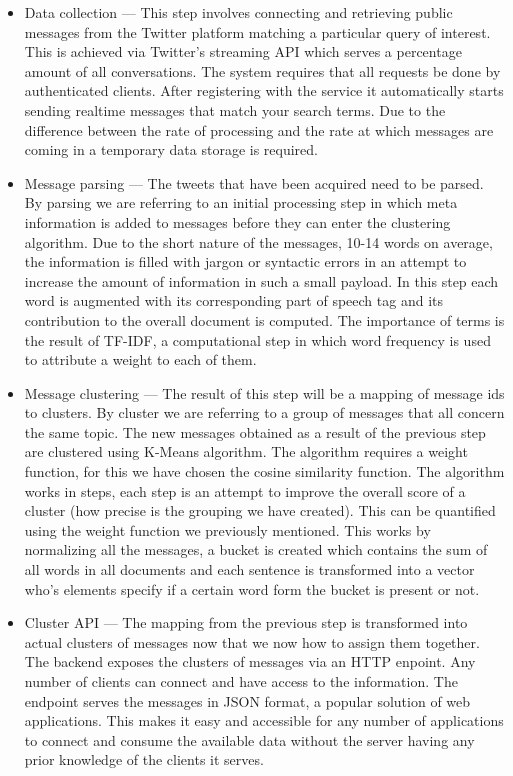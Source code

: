 \begin{itemize}
	\item Data collection --- This step involves connecting and retrieving public messages from the Twitter platform matching a particular query of interest. This is achieved via Twitter's streaming API which serves a percentage amount of all conversations. The system requires that all requests be done by authenticated clients. After registering with the service it automatically starts sending realtime messages that match your search terms. Due to the difference between the rate of processing and the rate at which messages are coming in a temporary data storage is required.
	\item Message parsing --- The tweets that have been acquired need to be parsed. By parsing we are referring to an initial processing step in which meta information is added to messages before they can enter the clustering algorithm. Due to the short nature of the messages, 10-14 words on average, the information is filled with jargon or syntactic errors in an attempt to increase the amount of information in such a small payload. In this step each word is augmented with its corresponding part of speech tag and its contribution to the overall document is computed. The importance of terms is the result of TF-IDF, a computational step in which word frequency is used to attribute a weight to each of them.
	\item Message clustering --- The result of this step will be a mapping of message ids to clusters. By cluster we are referring to a group of messages that all concern the same topic. The new messages obtained as a result of the previous step are clustered using K-Means algorithm. The algorithm requires a weight function, for this we have chosen the cosine similarity function. The algorithm works in steps, each step is an attempt to improve the overall score of a cluster (how precise is the grouping we have created). This can be quantified using the weight function we previously mentioned. This works by normalizing all the messages, a bucket is created which contains the sum of all words in all documents  and each sentence is transformed into a vector who's elements specify if a certain word form the bucket is present or not.
	\item Cluster API --- The mapping from the previous step is transformed into actual clusters of messages now that we now how to assign them together. The backend exposes the clusters of messages via an HTTP enpoint. Any number of clients can connect and have access to the information. The endpoint serves the messages in JSON format, a popular solution of web applications. This makes it easy and accessible for any number of applications to connect and consume the available data without the server having any prior knowledge of the clients it serves.

\end{itemize}
